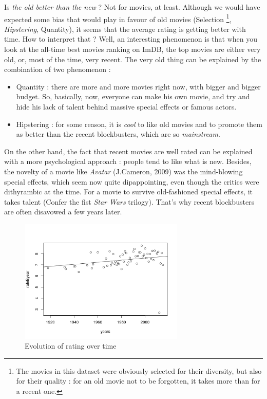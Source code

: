Is \textit{the old better than the new} ? Not for movies, at least.
Although we would have expected some bias that would play in favour of old movies (Selection \footnote{The movies in this dataset were obviously selected for their diversity, but also for their quality : for an old movie not to be forgotten, it takes more than for a recent one.},
 \textit{Hipstering}, Quantity), it seems that the average rating is getting better with time.
How to interpret that ? Well, an interesting phenomenon is that when you look at the all-time best movies ranking on ImDB, the top movies are either very old, or, most of the time, very recent.
The very old thing can be explained by the combination of two phenomenon :
\begin{itemize}
    \item Quantity : there are more and more movies right now, with bigger and bigger budget.
    So, basically, now, everyone can make his own movie, and try and hide his lack of talent behind massive special effects or famous actors.
    \item Hipstering : for some reason, it is \textit{cool} to like old movies and to promote them as better than the recent blockbusters, which are so \textit{mainstream}.
\end{itemize}
On the other hand, the fact that recent movies are well rated can be explained with a more psychological approach : people tend to like what is new.
Besides, the novelty of a movie like \textit{Avatar} (J.Cameron, 2009) was the mind-blowing special effects, which seem now quite dipappointing, even though the critics were dithyrambic at the time.
For a movie to survive old-fashioned special effects, it takes talent (Confer the fist \textit{Star Wars} trilogy).
That's why recent blockbusters are often disavowed a few years later.

\begin{figure}[!h]
\begin{center}
\includegraphics[width=0.70\textwidth]{../src/pre-processing/stats/results/ratingEvolution.png}
\end{center}
\caption{Evolution of rating over time}
\label{fig:ratingEvolution}
\end{figure}

